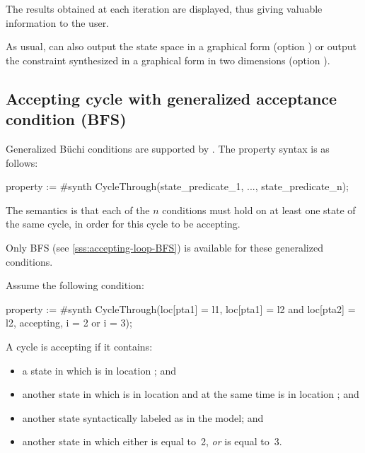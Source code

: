 The results obtained at each iteration are displayed, thus giving valuable information
to the user.

\medskip


As usual, \imitator{} can also
output the state space in a graphical form (option )
or
output the constraint synthesized in a graphical form in two dimensions (option ).



\subsection{Accepting cycle with generalized acceptance condition (BFS)}\label{sss:generalized-accepting-loop-BFS}

Generalized Büchi conditions are supported by \imitator{}.
The property syntax is as follows:

\begin{IMITATORproperty}
property := #synth CycleThrough(state_predicate_1, ..., state_predicate_n);
\end{IMITATORproperty}

The semantics is that each of the $n$ conditions must hold on at least one state of the same cycle, in order for this cycle to be accepting.

\begin{remark}
	Only BFS (see \cref{sss:accepting-loop-BFS}) is available for these generalized conditions.
\end{remark}


\begin{example}
	Assume the following condition:

\begin{IMITATORproperty}
property := #synth CycleThrough(loc[pta1] = l1, loc[pta1] = l2 and loc[pta2] = l2, accepting, i = 2 or i = 3);
\end{IMITATORproperty}

A cycle is accepting if it contains:
\begin{itemize}
	\item a state in which  is in location ; and
	\item another state in which  is in location  and at the same time  is in location ; and
	\item another state syntactically labeled as  in the model; and
	\item another state in which either  is equal to~2, \emph{or}  is equal to~3.
\end{itemize}


\end{example}

